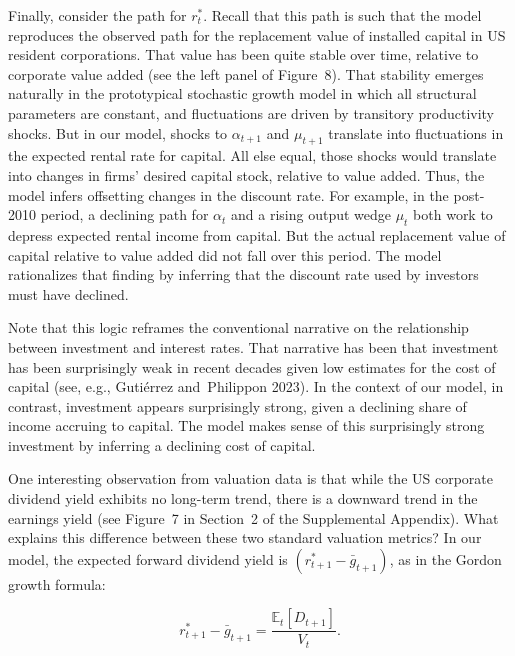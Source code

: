 \documentclass[11pt]{article}
\begin{document}
Finally, consider the path for $r_{t}^{*}$. Recall that this path is such that the model reproduces the observed path for the replacement value of installed capital in US resident corporations. That value has been quite stable over time, relative to corporate value added (see the left panel of Figure 8). That stability emerges naturally in the prototypical stochastic growth model in which all structural parameters are constant, and fluctuations are driven by transitory productivity shocks. But in our model, shocks to $\alpha _{t+1}$ and $\mu _{t+1}$ translate into fluctuations in the expected rental rate for capital. All else equal, those shocks would translate into changes in firms’ desired capital stock, relative to value added. Thus, the model infers offsetting changes in the discount rate. For example, in the post-2010 period, a declining path for $\alpha _{t}$ and a rising output wedge $\mu _{t}$ both work to depress expected rental income from capital. But the actual replacement value of capital relative to value added did not fall over this period. The model rationalizes that finding by inferring that the discount rate used by investors must have declined.


Note that this logic reframes the conventional narrative on the relationship between investment and interest rates. That narrative has been that investment has been surprisingly weak in recent decades given low estimates for the cost of capital (see, e.g., Gutiérrez and Philippon 2023). In the context of our model, in contrast, investment appears surprisingly strong, given a declining share of income accruing to capital. The model makes sense of this surprisingly strong investment by inferring a declining cost of capital.


One interesting observation from valuation data is that while the US corporate dividend yield exhibits no long-term trend, there is a downward trend in the earnings yield (see Figure 7 in Section 2 of the Supplemental Appendix). What explains this difference between these two standard valuation metrics? In our model, the expected forward dividend yield is $(r_{t+1}^{*}-\bar{g}_{t+1})$, as in the Gordon growth formula:


\setcounter{equation}{25}
\begin{equation}\label{eq:26}
r_{t+1}^*-\bar g_{t+1}=\frac{\mathbb{E}_t[D_{t+1}]}{V_t}.
\end{equation}
\end{document}
